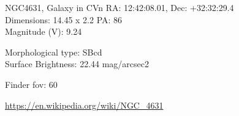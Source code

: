 \begin{block}{NGC4631, Galaxy in CVn}
    RA: 12:42:08.01, Dec: +32:32:29.4 \\ 
    Dimensions: 14.45 x 2.2 PA: 86 \\ 
    Magnitude (V): 9.24

    Morphological type: SBcd \\ 
    Surface Brightness: 22.44 mag/arcsec2 


    Finder fov: 60 

    \url{https://en.wikipedia.org/wiki/NGC_4631} 
\end{block}